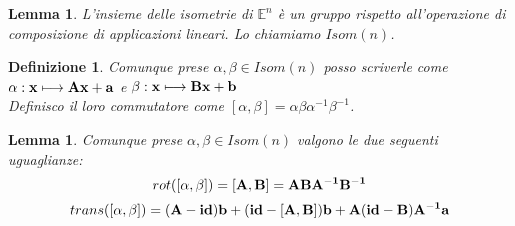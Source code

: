 \documentclass[10pt,a4paper]{article}
\newtheorem{definition}{Definizione}[section]
\newtheorem{lemma}[theorem]{Lemma}
\begin{document}
\begin{lemma}
L'insieme delle isometrie di  $\mathbb{E}^{n} $  è un gruppo rispetto all'operazione di composizione di applicazioni lineari. Lo chiamiamo $Isom(n)$.
\end{lemma}

\begin{definition}
	Comunque prese  $ \alpha , \beta \in Isom(n)$ posso scriverle come $\alpha : \vb{x} \longmapsto \vb{Ax + a}$ e $\beta : \vb{x} \longmapsto \vb{Bx + b}$ \\
	Definisco il loro commutatore come  $ [ \alpha , \beta] = \alpha \beta \alpha^{-1} \beta^{-1}$. 
\end{definition}

\begin{lemma}
Comunque prese  $ \alpha , \beta \in Isom(n)$ valgono le due seguenti uguaglianze:
\begin{equation}
rot([ \alpha	, \beta ]) = \vb{[A, B]} = \vb{ABA^{-1}B^{-1}}
\end{equation}  
\begin{equation}
trans([ \alpha	, \beta ]) = \vb{(A-id)b+(id-[A,B])b+A(id-B)A^{-1}a }
\end{equation} 
\end{lemma}
\end{document}
